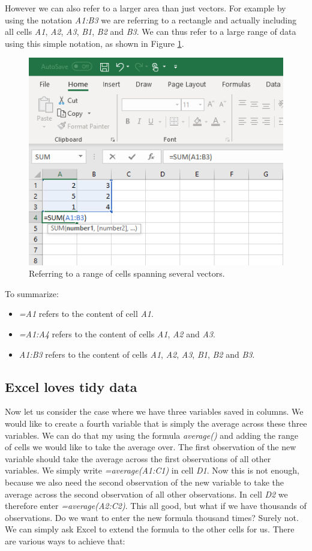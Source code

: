 \documentclass[]{book}
\providecommand{\tightlist}{%
  \setlength{\itemsep}{0pt}\setlength{\parskip}{0pt}}
\begin{document}
However we can also refer to a larger area than just vectors. For example by using the notation \emph{A1:B3} we are referring to a rectangle and actually including all cells \emph{A1}, \emph{A2}, \emph{A3}, \emph{B1}, \emph{B2} and \emph{B3}. We can thus refer to a large range of data using this simple notation, as shown in Figure \ref{fig:ex15}.

\begin{figure}

{\centering \includegraphics[width=0.6\linewidth]{_resources/chapter_excelbasic/ref3} 

}

\caption{Referring to a range of cells spanning several vectors.}\label{fig:ex15}
\end{figure}

To summarize:

\begin{itemize}
\tightlist
\item
  \emph{=A1} refers to the content of cell \emph{A1}.
\item
  \emph{=A1:A4} refers to the content of cells \emph{A1}, \emph{A2} and \emph{A3}.
\item
  \emph{A1:B3} refers to the content of cells \emph{A1}, \emph{A2}, \emph{A3}, \emph{B1}, \emph{B2} and \emph{B3}.
\end{itemize}

\hypertarget{excel-loves-tidy-data}{%
\subsection{Excel loves tidy data}\label{excel-loves-tidy-data}}

Now let us consider the case where we have three variables saved in columns. We would like to create a fourth variable that is simply the average across these three variables. We can do that my using the formula \emph{average()} and adding the range of cells we would like to take the average over. The first observation of the new variable should take the average across the first observations of all other variables. We simply write \emph{=average(A1:C1)} in cell \emph{D1}. Now this is not enough, because we also need the second observation of the new variable to take the average across the second observation of all other observations. In cell \emph{D2} we therefore enter \emph{=average(A2:C2)}. This all good, but what if we have thousands of observations. Do we want to enter the new formula thousand times? Surely not. We can simply ask Excel to extend the formula to the other cells for us. There are various ways to achieve that:
\end{document}
